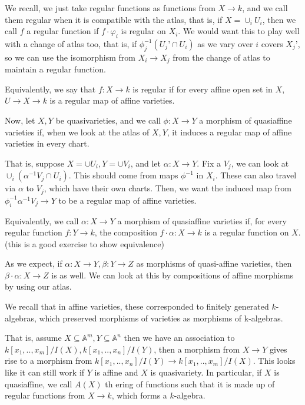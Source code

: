 \documentclass[10pt]{article}
\begin{document}
We recall, we just take regular functions as functions from $X \to k$, and we call them regular when it is compatible with the atlas, that is, if $X = \cup_i U_i$, then we call $f$ a regular function if $f \cdot \varphi_i$ is regular on $X_i$. We would want this to play well with a change of atlas too, that is, if $\phi^{-1}_j(U_j’ \cap U_i)$ as we vary over $i$ covers $X_j’$, so we can use the isomorphism from $X_i \to X_j$ from the change of atlas to maintain a regular function.

Equivalently, we say that $f: X \to k$ is regular if for every affine open set in $X$, $U \to X \to k$ is a regular map of affine varieties.

Now, let $X,Y$ be quasivarieties, and we call $\phi: X \to Y$ a morphism of quasiaffine varieties if, when we look at the atlas of $X,Y$, it induces a regular map of affine varieties in every chart.

That is, suppose $X = \cup U_i, Y = \cup V_i$, and let $\alpha: X \to Y$. Fix a $V_j$, we can look at $\cup_i (\alpha^{-1}V_j \cap U_i)$. This should come from maps $\phi^{-1}$ in $X_i$. These can also travel via $\alpha$ to $V_j$, which have their own charts. Then, we want the induced map from $\phi_i^{-1}\alpha^{-1}V_j \to Y$ to be a regular map of affine varieties.

Equivalently, we call $\alpha: X \to Y$ a morphism of quasiaffine varieties if, for every regular function $f: Y \to k$, the composition $f \cdot \alpha: X \to k$ is a regular function on $X$. (this is a good exercise to show equivalence)

As we expect, if $\alpha: X \to Y, \beta: Y \to Z$ as morphisms of quasi-affine varieties, then $\beta \cdot \alpha: X \to Z$ is as well. We can look at this by compositions of affine morphisms by using our atlas. 

We recall that in affine varieties, these corresponded to finitely generated $k$-algebras, which preserved morphisms of varieties as morphisms of k-algebras.

That is, assume $X \subseteq \mathbb{A}^m, Y \subseteq \mathbb{A}^n$ then we have an association to $k[x_1,..,x_m]/I(X), k[x_1,..,x_n]/I(Y)$, then a morphism from $X \to Y$ gives rise to a morphism from $k[x_1,..,x_n]/I(Y) \to k[x_1,..,x_m]/I(X)$. This looks like it can still work if $Y$ is affine and $X$ is quasivariety. In particular, if $X$ is quasiaffine, we call $A(X)$ th ering of functions such that it is made up of regular functions from $X \to k$, which forms a $k$-algebra.
\end{document}
